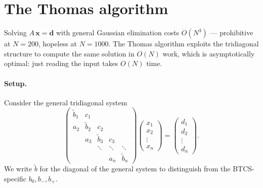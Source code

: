 \documentclass[11pt,a4paper]{article}
\begin{document}
\section{The Thomas algorithm}\label{sec:thomas}

Solving $A\,\mathbf{x} = \mathbf{d}$ with general Gaussian elimination
costs $O(N^3)$ — prohibitive at $N = 200$, hopeless at $N = 1000$.
The Thomas algorithm exploits the tridiagonal structure to compute
the same solution in $O(N)$ work, which is asymptotically optimal:
just reading the input takes $O(N)$ time.

\paragraph{Setup.} Consider the general tridiagonal system
\[
\begin{pmatrix}
\tilde b_1 & c_1        &            &            &        \\
a_2        & \tilde b_2 & c_2        &            &        \\
           & a_3        & \tilde b_3 & c_3        &        \\
           &            & \ddots     & \ddots     & \ddots \\
           &            &            & a_n        & \tilde b_n
\end{pmatrix}
\begin{pmatrix} x_1 \\ x_2 \\ \vdots \\ x_n \end{pmatrix}
=
\begin{pmatrix} d_1 \\ d_2 \\ \vdots \\ d_n \end{pmatrix}.
\]
We write $\tilde b$ for the diagonal of the general system to
distinguish from the BTCS-specific $b_0, b_-, b_+$.
\end{document}
